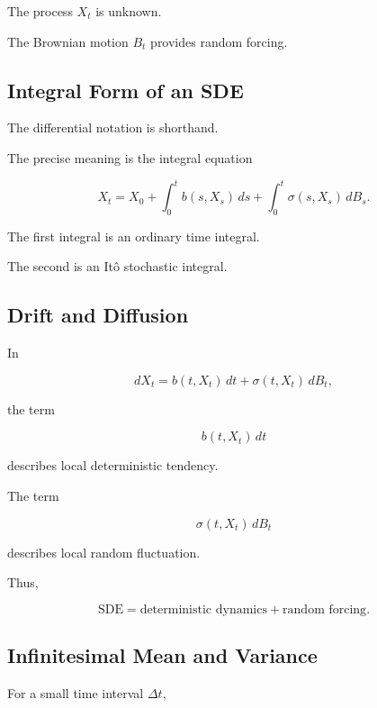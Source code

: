 The process \(X_t\) is unknown.

The Brownian motion \(B_t\) provides random forcing.

\subsection{Integral Form of an SDE}
\label{subsec:sde-integral-form}

The differential notation is shorthand.

The precise meaning is the integral equation

\[
\boxed{
X_t
=
X_0
+
\int_0^t
b(s,X_s)\,ds
+
\int_0^t
\sigma(s,X_s)\,dB_s.
}
\]

The first integral is an ordinary time integral.

The second is an It\^o stochastic integral.

\subsection{Drift and Diffusion}
\label{subsec:sde-drift-diffusion}

In

\[
dX_t
=
b(t,X_t)\,dt
+
\sigma(t,X_t)\,dB_t,
\]

the term

\[
b(t,X_t)\,dt
\]

describes local deterministic tendency.

The term

\[
\sigma(t,X_t)\,dB_t
\]

describes local random fluctuation.

Thus,

\[
\boxed{
\text{SDE}
=
\text{deterministic dynamics}
+
\text{random forcing}.
}
\]

\subsection{Infinitesimal Mean and Variance}
\label{subsec:sde-infinitesimal-mean-variance}

For a small time interval \(\Delta t\),

